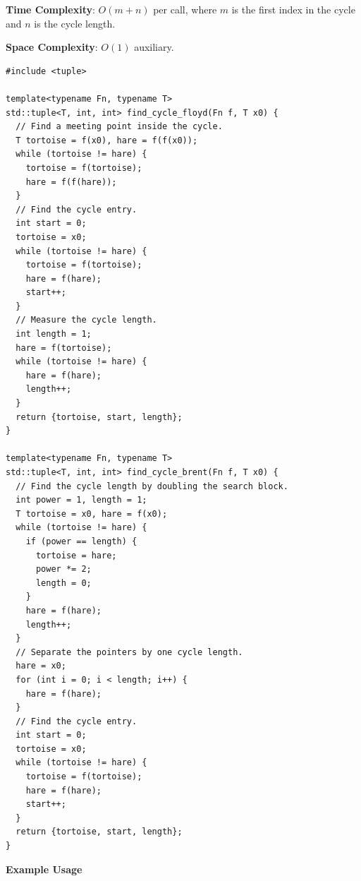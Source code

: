 \textbf{Time Complexity}: $O(m + n)$ per call, where $m$ is the first index in the cycle and $n$ is the cycle length.

\textbf{Space Complexity}: $O(1)$ auxiliary.

\begin{lstlisting}[style=cpp]
#include <tuple>

template<typename Fn, typename T>
std::tuple<T, int, int> find_cycle_floyd(Fn f, T x0) {
  // Find a meeting point inside the cycle.
  T tortoise = f(x0), hare = f(f(x0));
  while (tortoise != hare) {
    tortoise = f(tortoise);
    hare = f(f(hare));
  }
  // Find the cycle entry.
  int start = 0;
  tortoise = x0;
  while (tortoise != hare) {
    tortoise = f(tortoise);
    hare = f(hare);
    start++;
  }
  // Measure the cycle length.
  int length = 1;
  hare = f(tortoise);
  while (tortoise != hare) {
    hare = f(hare);
    length++;
  }
  return {tortoise, start, length};
}

template<typename Fn, typename T>
std::tuple<T, int, int> find_cycle_brent(Fn f, T x0) {
  // Find the cycle length by doubling the search block.
  int power = 1, length = 1;
  T tortoise = x0, hare = f(x0);
  while (tortoise != hare) {
    if (power == length) {
      tortoise = hare;
      power *= 2;
      length = 0;
    }
    hare = f(hare);
    length++;
  }
  // Separate the pointers by one cycle length.
  hare = x0;
  for (int i = 0; i < length; i++) {
    hare = f(hare);
  }
  // Find the cycle entry.
  int start = 0;
  tortoise = x0;
  while (tortoise != hare) {
    tortoise = f(tortoise);
    hare = f(hare);
    start++;
  }
  return {tortoise, start, length};
}
\end{lstlisting}
\textbf{Example Usage}\par
